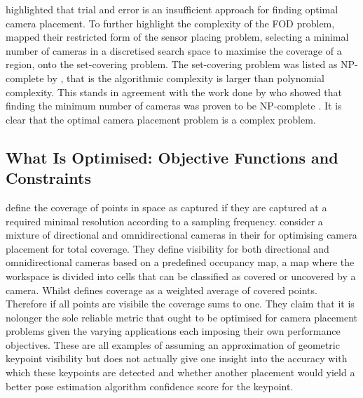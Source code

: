 \citet{olague2002optimal} highlighted that trial and error is an insufficient approach for finding optimal camera placement.
To further highlight the complexity of the FOD problem, \citet{tarbox1995planning} mapped their restricted form of the sensor placing problem, selecting a minimal number of cameras in a discretised search space to maximise the coverage of a region,  onto the set-covering problem. The set-covering problem was listed as NP-complete by \citet{karp1972reducibility}, that is the algorithmic complexity is larger than polynomial complexity. This stands in agreement with the work done by \citet{lee1986computational} who showed that finding the minimum number of cameras was proven to be NP-complete \cite{lee1986computational}.
It is clear that the optimal camera placement problem is a complex problem.

\subsection{What Is Optimised: Objective Functions and Constraints}

\citet{horster2006optimal} define the coverage of points in space as captured if they are captured at a required minimal resolution according to a sampling frequency.
\citet{gonzalez2009optimal} consider a mixture of directional and omnidirectional cameras in their for optimising camera placement for total coverage. They define visibility for both directional and omnidirectional cameras based on a predefined occupancy map, a map where the workspace is divided into cells that can be classified as covered or uncovered by a camera.
Whilst \citet{zhao2013approximate} defines coverage as a weighted average of covered points. Therefore if all points are visibile the coverage sums to one. They claim that it is nolonger the sole reliable metric that ought to be optimised for camera placement problems given the varying applications each imposing their own performance objectives.
These are all examples of assuming an approximation of geometric keypoint visibility but does not actually give one insight into the accuracy with which these keypoints are detected and whether another placement would yield a better pose estimation algorithm confidence score for the keypoint.

